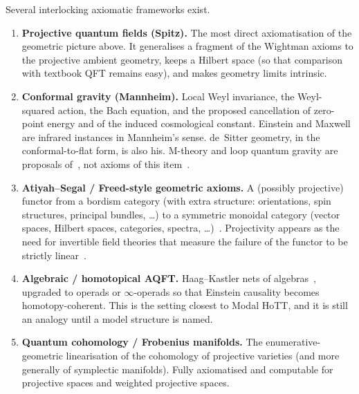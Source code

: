 \documentclass{article}
\theoremstyle{definition}
\begin{document}
Several interlocking axiomatic frameworks exist.

\begin{enumerate}[label=\arabic*.]
  \item \textbf{Projective quantum fields (Spitz).}
        The most direct axiomatisation of the geometric picture above.
        It generalises a fragment of the Wightman axioms to the projective
        ambient geometry, keeps a Hilbert space (so that comparison with
        textbook QFT remains easy), and makes geometry limits intrinsic.

  \item \textbf{Conformal gravity (Mannheim).}
        Local Weyl invariance, the Weyl-squared action, the Bach equation,
        and the proposed cancellation of zero-point energy and of the induced
        cosmological constant.  Einstein and Maxwell are infrared instances
        in Mannheim's sense.  de~Sitter geometry, in the conformal-to-flat
        form, is also his.  M-theory and loop quantum gravity are proposals
        of~\cite{TonpaConf}, not axioms of this item~\cite{Mannheim2011}.

  \item \textbf{Atiyah--Segal / Freed-style geometric axioms.}
        A (possibly projective) functor from a bordism category (with extra
        structure: orientations, spin structures, principal bundles, \ldots)
        to a symmetric monoidal category (vector spaces, Hilbert spaces,
        categories, spectra, \ldots)~\cite{Atiyah1988}.  Projectivity appears
        as the need for invertible field theories that measure the failure of
        the functor to be strictly linear~\cite{FreedAnomalies,FreedHopkins}.

  \item \textbf{Algebraic / homotopical AQFT.}
        Haag--Kastler nets of algebras~\cite{HaagKastler}, upgraded to operads
        or \(\infty\)-operads so that Einstein causality becomes
        homotopy-coherent.  This is the setting closest to Modal HoTT, and it
        is still an analogy until a model structure is named.

  \item \textbf{Quantum cohomology / Frobenius manifolds.}
        The enumerative-geometric linearisation of the cohomology of projective
        varieties (and more generally of symplectic manifolds).  Fully
        axiomatised and computable for projective spaces and weighted projective
        spaces.
\end{enumerate}
\end{document}
